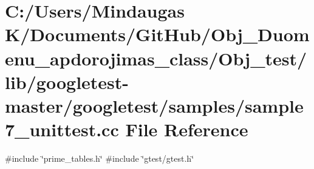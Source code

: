 \hypertarget{_obj__test_2lib_2googletest-master_2googletest_2samples_2sample7__unittest_8cc}{}\section{C\+:/\+Users/\+Mindaugas K/\+Documents/\+Git\+Hub/\+Obj\+\_\+\+Duomenu\+\_\+apdorojimas\+\_\+class/\+Obj\+\_\+test/lib/googletest-\/master/googletest/samples/sample7\+\_\+unittest.cc File Reference}
\label{_obj__test_2lib_2googletest-master_2googletest_2samples_2sample7__unittest_8cc}
{\ttfamily \#include \char`\"{}prime\+\_\+tables.\+h\char`\"{}}\newline
{\ttfamily \#include \char`\"{}gtest/gtest.\+h\char`\"{}}\newline
